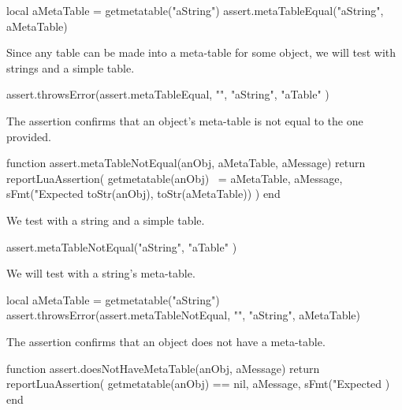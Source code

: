 \startLuaTest
  local aMetaTable = getmetatable("aString")
  assert.metaTableEqual("aString", aMetaTable)
\stopLuaTest
\stopTestCase


Since any table can be made into a meta-table for some object, we will 
test with strings and a simple table. 

\startLuaTest
  assert.throwsError(assert.metaTableEqual, "",
    "aString", { "aTable" })
\stopLuaTest
\stopTestCase

\stopTestSuite


The  assertion confirms that an object's 
meta-table is not equal to the one provided. 

\startLuaCode
function assert.metaTableNotEqual(anObj, aMetaTable, aMessage)
  return reportLuaAssertion(
    getmetatable(anObj) ~= aMetaTable,
    aMessage,
    sFmt("Expected %
      toStr(anObj), toStr(aMetaTable))
  )
end
\stopLuaCode


We test with a string and a simple table.

\startLuaTest
  assert.metaTableNotEqual("aString", { "aTable" })
\stopLuaTest
\stopTestCase


We will test with a string's meta-table.

\startLuaTest
  local aMetaTable = getmetatable("aString")
  assert.throwsError(assert.metaTableNotEqual, "",
    "aString", aMetaTable)
\stopLuaTest
\stopTestCase

\stopTestSuite


The  assertion confirms that an object 
does not have a meta-table. 

\startLuaCode
function assert.doesNotHaveMetaTable(anObj, aMessage)
  return reportLuaAssertion(
    getmetatable(anObj) == nil,
    aMessage,
    sFmt("Expected %
  )
end
\stopLuaCode


